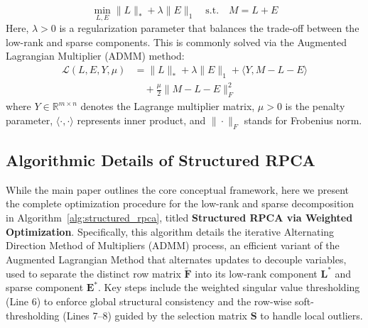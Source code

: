 \begin{equation}
    \min_{L, E} \|L\|_* + \lambda \|E\|_1 \quad \text{s.t.} \quad M = L + E \label{eq:RPCA-approx}
\end{equation}
Here, $\lambda > 0$ is a regularization parameter that balances the trade-off between the low-rank and sparse components.
This is commonly solved via the Augmented Lagrangian Multiplier (ADMM) method:
\begin{equation}
    \begin{aligned} \mathcal{L}(L, E, Y, \mu) &= \|L\|_* + \lambda \|E\|_1 + \langle Y, M - L - E \rangle \\ &\quad + \frac{\mu}{2} \|M - L - E\|_F^2 \end{aligned} \label{eq:RPCA-lagrange}
\end{equation}
where $Y \in \mathbb{R}^{m \times n}$ denotes the Lagrange multiplier matrix, $\mu > 0$ is the penalty parameter, $\langle \cdot, \cdot \rangle$ represents inner product, and  $\|\cdot\|_F$ stands for Frobenius norm.

\subsection{Algorithmic Details of Structured RPCA}
\label{subsec:algorithm}
While the main paper outlines the core conceptual framework, here we present the complete optimization procedure for the low-rank and sparse decomposition in Algorithm~\ref{alg:structured_rpca}, titled \textbf{Structured RPCA via Weighted Optimization}. 
Specifically, this algorithm details the iterative Alternating Direction Method of Multipliers (ADMM) process, an efficient variant of the Augmented Lagrangian Method that alternates updates to decouple variables, used to separate the distinct row matrix $\tilde{\mathbf{F}}$ into its low-rank component $\mathbf{L}^*$ and sparse component $\mathbf{E}^*$. 
Key steps include the weighted singular value thresholding (Line 6) to enforce global structural consistency and the row-wise soft-thresholding (Lines 7--8) guided by the selection matrix $\mathbf{S}$ to handle local outliers.

